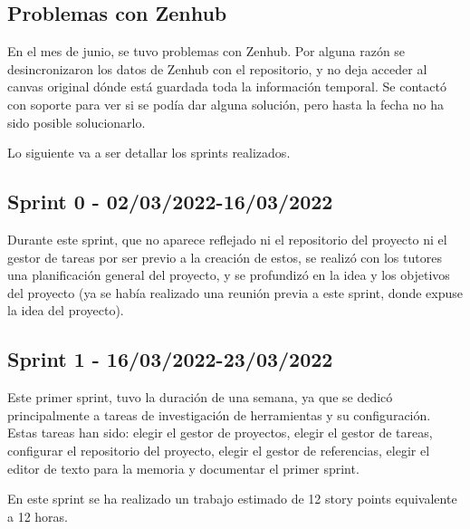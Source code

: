 \subsection{Problemas con Zenhub}

En el mes de junio, se tuvo problemas con Zenhub. Por alguna razón se desincronizaron los datos de Zenhub con el repositorio, y no deja acceder al canvas original dónde está guardada toda la información temporal. Se contactó con soporte para ver si se podía dar alguna solución, pero hasta la fecha no ha sido posible solucionarlo.


Lo siguiente va a ser detallar los sprints realizados.

\subsection{Sprint 0 - 02/03/2022-16/03/2022}
Durante este sprint, que no aparece reflejado ni el repositorio del proyecto ni el gestor de tareas por ser previo a la creación de estos, se realizó con los tutores una planificación general del proyecto, y se profundizó en la idea y los objetivos del proyecto (ya se había realizado una reunión previa a este sprint, donde expuse la idea del proyecto). 
\newpage
\subsection{Sprint 1 - 16/03/2022-23/03/2022}
Este primer sprint, tuvo la duración de una semana, ya que se dedicó principalmente a tareas de investigación de herramientas y su configuración. Estas tareas han sido: elegir el gestor de proyectos, elegir el gestor de tareas, configurar el repositorio del proyecto, elegir el gestor de referencias, elegir el editor de texto para la memoria y documentar el primer sprint.


En este sprint se ha realizado un trabajo estimado de 12 story points equivalente a 12 horas.

